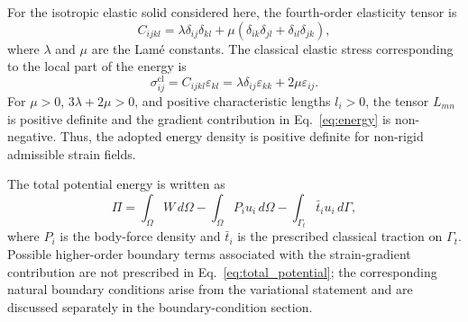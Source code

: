 \documentclass[final,3p,times,fleqn]{elsarticle}
\begin{document}
For the isotropic elastic solid considered here, the fourth-order
elasticity tensor is
\begin{equation}\label{eq:elasticity_tensor}
C_{ijkl}
=
\lambda\delta_{ij}\delta_{kl}
+
\mu\left(\delta_{ik}\delta_{jl}+\delta_{il}\delta_{jk}\right),
\end{equation}
where $\lambda$ and $\mu$ are the Lamé constants. The classical elastic
stress corresponding to the local part of the energy is
\begin{equation}\label{eq:classical_stress}
\sigma_{ij}^{\mathrm{cl}}
=
C_{ijkl}\varepsilon_{kl}
=
\lambda\delta_{ij}\varepsilon_{kk}
+
2\mu\varepsilon_{ij}.
\end{equation}
For $\mu>0$, $3\lambda+2\mu>0$, and positive characteristic lengths
$l_i>0$, the tensor $L_{mn}$ is positive definite and the gradient
contribution in Eq.~\eqref{eq:energy} is non-negative. Thus, the adopted
energy density is positive definite for non-rigid admissible strain
fields.

The total potential energy is written as
\begin{equation}\label{eq:total_potential}
\Pi
=
\int_{\Omega}W\,d\Omega
-
\int_{\Omega}P_i u_i\,d\Omega
-
\int_{\Gamma_t}\bar{t}_i u_i\,d\Gamma ,
\end{equation}
where $P_i$ is the body-force density and $\bar{t}_i$ is the prescribed
classical traction on $\Gamma_t$. Possible higher-order boundary terms
associated with the strain-gradient contribution are not prescribed in
Eq.~\eqref{eq:total_potential}; the corresponding natural boundary
conditions arise from the variational statement and are discussed
separately in the boundary-condition section.
\end{document}
